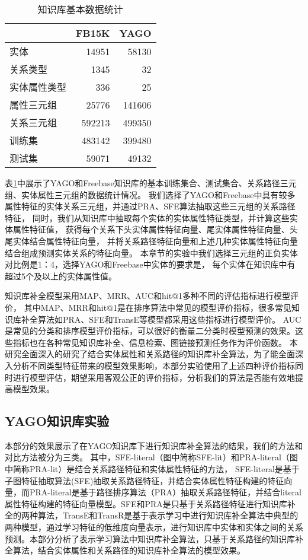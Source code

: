 \begin{table}[htbp]
  \centering
  \caption{知识库基本数据统计}
    \begin{tabular}{|l|r|r|}
    \hline
    \textcolor[rgb]{ .141,  .161,  .18}{} & \multicolumn{1}{l|}{FB15K} & \multicolumn{1}{l|}{YAGO} \\
    \hline
    实体    & 14951 & 58130 \\
    \hline
    关系类型  & 1345  & 32 \\
    \hline
    实体属性类型 & 336   & 25 \\
    \hline
    属性三元组 & 25776 & 141606 \\
    \hline
    关系三元组 & 592213 & 499350 \\
    \hline
    训练集   & 483142 & 399480 \\
    \hline
    测试集   & 59071 & 49132 \\
    \hline
    \end{tabular}%
  \label{tab:addlabel-kbcExp-data}%
\end{table}%

表\ref{tab:addlabel-kbcExp-data}中展示了YAGO和Freebase知识库的基本训练集合、测试集合、关系路径三元组、实体属性三元组的数据统计情况。
我们选择了YAGO和Freebase中具有较多属性特征的实体关系三元组，并通过PRA、SFE算法抽取这些三元组的关系路径特征，
同时，我们从知识库中抽取每个实体的实体属性特征类型，并计算这些实体属性特征值，
获得每个关系下头实体属性特征向量、尾实体属性特征向量、头尾实体结合属性特征向量，
并将关系路径特征向量和上述几种实体属性特征向量结合组成预测实体关系的特征向量。
本章节的实验中我们选择三元组的正负实体对比例是1：4，选择YAGO和Freebase中实体的要求是，
每个实体在知识库中有超过5个及以上的实体属性值。

知识库补全模型采用MAP、MRR、AUC和hit@1多种不同的评估指标进行模型评价，
其中MAP、MRR和hit@1是在排序算法中常见的模型评价指标，很多常见知识库补全算法如PRA、SFE和TransE等模型都采用这些指标进行模型评价。
AUC是常见的分类和排序模型评价指标，可以很好的衡量二分类时模型预测的效果。这些指标也在各种常见知识库补全、信息检索、图链接预测任务作为评价函数。
本研究全面深入的研究了结合实体属性和关系路径的知识库补全算法，为了能全面深入分析不同类型特征带来的模型效果影响，本部分实验使用了上述四种评价指标同时进行模型评估，期望采用客观公正的评价指标，分析我们的算法是否能有效地提高模型效果。

\subsection{YAGO知识库实验}
\label{cha:exp-literal}
本部分的效果展示了在YAGO知识库下进行知识库补全算法的结果，我们的方法和对比方法被分为三类。
其中，SFE-literal（图中简称SFE-lit）和PRA-literal（图中简称PRA-lit）是结合关系路径特征和实体属性特征的方法，
SFE-literal是基于子图特征抽取算法(SFE)抽取关系路径特征，并结合实体属性特征构建的特征向量，而PRA-literal是基于路径排序算法（PRA）抽取关系路径特征，并结合literal属性特征构建的特征向量模型。SFE和PRA是只基于关系路径特征进行知识库补全的两种算法，TransE和TransR是基于表示学习中进行知识库补全算法中典型的两种模型，通过学习特征的低维度向量表示，进行知识库中实体和实体之间的关系预测。本部分分析了表示学习算法中知识库补全算法，只基于关系路径的知识库补全算法，结合实体属性和关系路径的知识库补全算法的模型效果。


